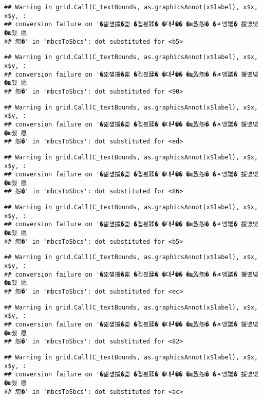 \documentclass[
]{article}
\begin{document}
\begin{verbatim}
## Warning in grid.Call(C_textBounds, as.graphicsAnnot(x$label), x$x, x$y, :
## conversion failure on '�낆쟾援�쁾 �곕룄蹂� �대┛�� �щ쭩怨� �ㅼ엥議� 援먰넻�ш퀬 愿
## 怨�' in 'mbcsToSbcs': dot substituted for <b5>
\end{verbatim}

\begin{verbatim}
## Warning in grid.Call(C_textBounds, as.graphicsAnnot(x$label), x$x, x$y, :
## conversion failure on '�낆쟾援�쁾 �곕룄蹂� �대┛�� �щ쭩怨� �ㅼ엥議� 援먰넻�ш퀬 愿
## 怨�' in 'mbcsToSbcs': dot substituted for <90>
\end{verbatim}

\begin{verbatim}
## Warning in grid.Call(C_textBounds, as.graphicsAnnot(x$label), x$x, x$y, :
## conversion failure on '�낆쟾援�쁾 �곕룄蹂� �대┛�� �щ쭩怨� �ㅼ엥議� 援먰넻�ш퀬 愿
## 怨�' in 'mbcsToSbcs': dot substituted for <ed>
\end{verbatim}

\begin{verbatim}
## Warning in grid.Call(C_textBounds, as.graphicsAnnot(x$label), x$x, x$y, :
## conversion failure on '�낆쟾援�쁾 �곕룄蹂� �대┛�� �щ쭩怨� �ㅼ엥議� 援먰넻�ш퀬 愿
## 怨�' in 'mbcsToSbcs': dot substituted for <86>
\end{verbatim}

\begin{verbatim}
## Warning in grid.Call(C_textBounds, as.graphicsAnnot(x$label), x$x, x$y, :
## conversion failure on '�낆쟾援�쁾 �곕룄蹂� �대┛�� �щ쭩怨� �ㅼ엥議� 援먰넻�ш퀬 愿
## 怨�' in 'mbcsToSbcs': dot substituted for <b5>
\end{verbatim}

\begin{verbatim}
## Warning in grid.Call(C_textBounds, as.graphicsAnnot(x$label), x$x, x$y, :
## conversion failure on '�낆쟾援�쁾 �곕룄蹂� �대┛�� �щ쭩怨� �ㅼ엥議� 援먰넻�ш퀬 愿
## 怨�' in 'mbcsToSbcs': dot substituted for <ec>
\end{verbatim}

\begin{verbatim}
## Warning in grid.Call(C_textBounds, as.graphicsAnnot(x$label), x$x, x$y, :
## conversion failure on '�낆쟾援�쁾 �곕룄蹂� �대┛�� �щ쭩怨� �ㅼ엥議� 援먰넻�ш퀬 愿
## 怨�' in 'mbcsToSbcs': dot substituted for <82>
\end{verbatim}

\begin{verbatim}
## Warning in grid.Call(C_textBounds, as.graphicsAnnot(x$label), x$x, x$y, :
## conversion failure on '�낆쟾援�쁾 �곕룄蹂� �대┛�� �щ쭩怨� �ㅼ엥議� 援먰넻�ш퀬 愿
## 怨�' in 'mbcsToSbcs': dot substituted for <ac>
\end{verbatim}
\end{document}
